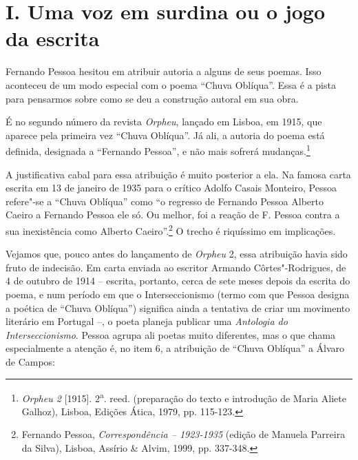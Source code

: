 \bigskip


\section*{I. Uma voz em surdina ou o jogo da escrita}

Fernando Pessoa hesitou em atribuir autoria a alguns de seus poemas.
Isso aconteceu de um modo especial com o poema ``Chuva Oblíqua''. Essa é
a pista para pensarmos sobre como se deu a construção autoral em sua
obra.

É no segundo número da revista \emph{Orpheu}, lançado em Lisboa, em
1915, que aparece pela primeira vez ``Chuva Oblíqua''. Já ali, a autoria
do poema está definida, designada a ``Fernando Pessoa'', e não mais
sofrerá mudanças.\footnote{\emph{Orpheu 2} {[}1915{]}.
  2\textsuperscript{a}. reed. (preparação do texto e introdução de Maria
  Aliete Galhoz), Lisboa, Edições Ática, 1979, pp. 115-123.}

A justificativa cabal para essa atribuição é muito posterior a ela. Na
famosa carta escrita em 13 de janeiro de 1935 para o crítico Adolfo
Casais Monteiro, Pessoa refere"-se a ``Chuva Oblíqua'' como ``o regresso
de Fernando Pessoa Alberto Caeiro a Fernando Pessoa ele só. Ou melhor,
foi a reação de F. Pessoa contra a sua inexistência como Alberto
Caeiro''.\footnote{Fernando Pessoa, \emph{Correspondência -- 1923-1935}
  (edição de Manuela Parreira da Silva), Lisboa, Assírio \& Alvim, 1999,
  pp. 337-348.} O trecho é riquíssimo em implicações.

Vejamos que, pouco antes do lançamento de \emph{Orpheu} 2, essa
atribuição havia sido fruto de indecisão. Em carta enviada ao
escritor Armando Côrtes"-Rodrigues, de 4 de outubro de 1914 -- escrita, portanto, cerca de sete meses depois da escrita do poema, e num período
em que o Interseccionismo (termo com que Pessoa designa a poética de
``Chuva Oblíqua'') significa ainda a tentativa de criar um movimento
literário em Portugal --, o poeta planeja publicar uma \emph{Antologia
do Interseccionismo}. Pessoa agrupa ali poetas muito diferentes, mas o
que chama especialmente a atenção é, no item 6, a atribuição de ``Chuva
Oblíqua'' a Álvaro de Campos:

